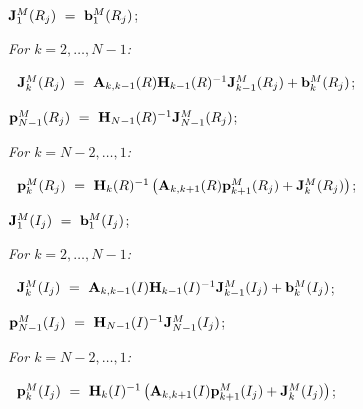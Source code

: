 \documentclass[preprint,12pt]{elsarticle}
\begin{document}
\vspace{0.5cm}
\par {}
\begin{description}
  \item ${\bf J}^M_1(R_j) ~=~ {\bf b}^M_1(R_j)$;
  \item \it For $k=2,\dots,N-1$:
  \item $~$\hspace{0.5cm} ${\bf J}^M_k(R_j) ~=~ {\bf A}_{k,k-1}(R){\bf H}_{k-1}(R)^{-1}{\bf J}^M_{k-1}(R_j)+{\bf b}^M_k(R_j)$;
  \item ${\bf p}^M_{N-1}(R_j) ~=~ {\bf H}_{N-1}(R)^{-1}{\bf J}^M_{N-1}(R_j)$;
  \item \it For $k=N-2,\dots,1$:
  \item $~$\hspace{0.5cm} ${\bf p}^M_k(R_j) ~=~ {\bf H}_k(R)^{-1}\left({\bf A}_{k,k+1}(R){\bf p}^M_{k+1}(R_j)+{\bf J}^M_k(R_j)\right)$;
\end{description}

\vspace{0.5cm}
\par {}
\begin{description}
  \item ${\bf J}^M_1(I_j) ~=~ {\bf b}^M_1(I_j)$;
  \item \it For $k=2,\dots,N-1$:
  \item $~$\hspace{0.5cm} ${\bf J}^M_k(I_j) ~=~ {\bf A}_{k,k-1}(I){\bf H}_{k-1}(I)^{-1}{\bf J}^M_{k-1}(I_j)+{\bf b}^M_k(I_j)$;
  \item ${\bf p}^M_{N-1}(I_j) ~=~ {\bf H}_{N-1}(I)^{-1}{\bf J}^M_{N-1}(I_j)$;
  \item \it For $k=N-2,\dots,1$:
  \item $~$\hspace{0.5cm} ${\bf p}^M_k(I_j) ~=~ {\bf H}_k(I)^{-1}\left({\bf A}_{k,k+1}(I){\bf p}^M_{k+1}(I_j)+{\bf J}^M_k(I_j)\right)$;
\end{description}
\end{document}
